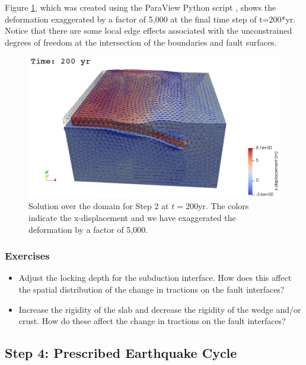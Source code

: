 Figure \ref{fig:example:subduction:3d:step03}, which was created
using the ParaView Python script , shows
the deformation exaggerated by a factor of 5,000 at the final time
step of t=200*yr. Notice that there are some local edge effects
associated with the unconstrained degrees of freedom at the
intersection of the boundaries and fault surfaces.

\begin{figure}
  \includegraphics[width=5.0in]{examples/figs/subduction3d_step03_soln}
  \caption{Solution over the domain for Step 2 at $t=200 \mathrm{yr}$. The colors indicate
    the x-displacement and we have exaggerated the
    deformation by a factor of 5,000.}
  \label{fig:example:subduction:3d:step03}
\end{figure}


\subsubsection{Exercises}

\begin{itemize}
\item Adjust the locking depth for the subduction interface. How does this
  affect the spatial distribution of the change in tractions on
  the fault interfaces?
\item Increase the rigidity of the slab and decrease the rigidity of
  the wedge and/or crust. How do these affect the change in tractions
  on the fault interfaces?
\end{itemize}


\subsection{Step 4: Prescribed Earthquake Cycle}

